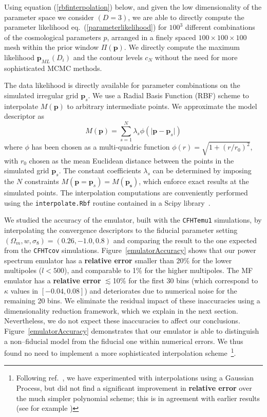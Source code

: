 \documentclass[reprint,aps,prd,superscriptaddress,showkeys,showpacs]{revtex4-1}
\begin{document}
Using equation (\ref{rbfinterpolation}) below, and given the low
dimensionality of the parameter space we consider $(D=3)$, we are able
to directly compute the parameter likelihood
eq.~(\ref{parameterlikelihood}) for $100^3$ different combinations of
the cosmological parameters $p$, arranged in a finely spaced
$100\times100\times100$ mesh within the prior window
$\Pi(\mathbf{p})$. We directly compute the maximum likelihood
$\mathbf{p}_{ML}(D_i)$ and the contour levels $c_N$ without the need
for more sophisticated MCMC methods.

The data likelihood is directly available for parameter combinations
on the simulated irregular grid $\mathbf{p}_s$.  We use a Radial Basis
Function (RBF) scheme to interpolate $M(\mathbf{p})$ to arbitrary
intermediate points.  We approximate the model descriptor as
\begin{equation}
\label{rbfinterpolation}
M(\mathbf{p}) = \sum_{s=1}^N \lambda_s\phi(\vert\mathbf{p}-\mathbf{p}_s\vert)
\end{equation}
where $\phi$ has been chosen as a multi-quadric function
$\phi(r)=\sqrt{1+(r/r_0)^2}$, with $r_0$ chosen as the mean Euclidean
distance between the points in the simulated grid $\mathbf{p}_s$. The
constant coefficients $\lambda_s$ can be determined by imposing the
$N$ constraints $M(\mathbf{p}=\mathbf{p}_s)=M(\mathbf{p_s})$, which
enforce exact results at the simulated points. The interpolation
computations are conveniently performed using the
\texttt{interpolate.Rbf} routine contained in a Scipy library~\citep{scipy}.

We studied the accuracy of the emulator, built with the
\texttt{CFHTemu1} simulations, by interpolating the convergence
descriptors to the fiducial parameter setting
$(\Omega_m,w,\sigma_8)=(0.26,-1.0,0.8)$ and comparing the result to
the one expected from the \texttt{CFHTcov}
simulations. Figure~\ref{emulatorAccuracy} shows that our power
spectrum emulator has a \textbf{relative error} smaller than 20\% for the lower
multipoles ($l<500$), and comparable to 1\% for the higher multipoles. The MF
emulator has a \textbf{relative error} $\lesssim$10\% for the first 30 bins (which
correspond to $\kappa$ values in $[-0.04,0.08]$) and deteriorates due
to numerical noise for the remaining 20 bins. We eliminate the
residual impact of these inaccuracies using a dimensionality reduction
framework, which we explain in the next section. Nevertheless, we do
not expect these inaccuracies to affect our
conclusions. Figure~\ref{emulatorAccuracy} demonstrates that our
emulator is able to distinguish a non--fiducial model from the
fiducial one within numerical errors.  We thus found no need to
implement a more sophisticated interpolation
scheme~\footnote{Following ref.~\citep{coyote2}, we have experimented with interpolations using a Gaussian Process, but did not find a significant improvement in \textbf{relative error} over the much simpler polynomial scheme; this is in agreement with earlier results (see for example \citep{KnoxGP})}.
\end{document}
